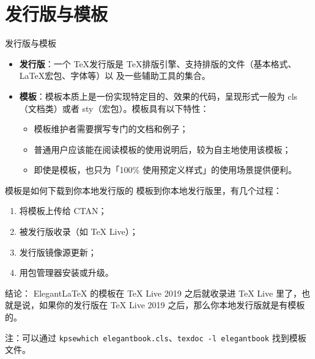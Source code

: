 
\section{发行版与模板}
\begin{frame}{发行版与模板}

  \begin{itemize}
    \item \textbf{发行版}：一个 \TeX 发行版是 \TeX 排版引擎、支持排版的文件（基本格式、\LaTeX 宏包、字体等）以
    及一些辅助工具的集合。\\[3ex]
    \item \textbf{模板}：模板本质上是一份实现特定目的、效果的代码，呈现形式一般为 cls（文档类）或者 sty（宏包）。模板具有以下特性：
    \begin{itemize}
      \item 模板维护者需要撰写专门的文档和例子；
      \item 普通用户应该能在阅读模板的使用说明后，较为自主地使用该模板；
      \item 即使是模板，也只为「100\% 使用预定义样式」的使用场景提供便利。
    \end{itemize}
  \end{itemize}
\end{frame}

\begin{frame}[fragile]{模板是如何下载到你本地发行版的}
  模板到你本地发行版里，有几个过程：
  \begin{enumerate}
    \item 将模板上传给 CTAN；
    \item 被发行版收录（如 TeX Live）；
    \item 发行版镜像源更新；
    \item 用包管理器安装或升级。
  \end{enumerate}

  \textcolor{iron}{结论：} ElegantLaTeX 的模板在 TeX Live 2019 之后就收录进 TeX Live 里了，也就是说，如果你的发行版在 TeX Live 2019 之后，那么你本地发行版就是有模板的。

  注：可以通过 \lstinline{kpsewhich elegantbook.cls}、\lstinline{texdoc -l elegantbook} 找到模板文件。
\end{frame}

